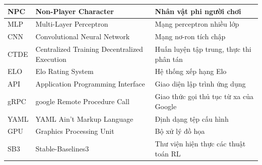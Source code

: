 \begin{longtable}{|>{\centering\arraybackslash}p{2.4cm}|p{4.5cm}|p{6.7cm}|}
NPC     & Non-Player Character & Nhân vật phi người chơi \\ \hline
MLP     & Multi-Layer Perceptron & Mạng perceptron nhiều lớp \\ \hline
CNN     & Convolutional Neural Network & Mạng nơ-ron tích chập \\ \hline
CTDE    & Centralized Training Decentralized Execution & Huấn luyện tập trung, thực thi phân tán \\ \hline
ELO     & Elo Rating System & Hệ thống xếp hạng Elo \\ \hline
API     & Application Programming Interface & Giao diện lập trình ứng dụng \\ \hline
gRPC    & google Remote Procedure Call & Giao thức gọi thủ tục từ xa của Google \\ \hline
YAML    & YAML Ain't Markup Language & Định dạng tệp cấu hình \\ \hline
GPU     & Graphics Processing Unit & Bộ xử lý đồ họa \\ \hline
SB3     & Stable-Baselines3 & Thư viện hiện thực các thuật toán RL \\ \hline
\end{longtable}
\endgroup
